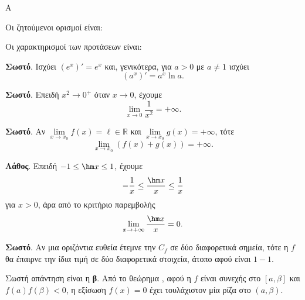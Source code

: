 \begin{thema}{Α}
\begin{erwthma}
\item {}

\item Οι ζητούμενοι ορισμοί είναι:

\item {}

\item Οι χαρακτηρισμοί των προτάσεων είναι:
\begin{alist}
\item \textbf{Σωστό}. Ισχύει $(e^x)'=e^x$ και, γενικότερα, για $a>0$ με $a\neq1$ ισχύει
\[ (a^x)'=a^x\ln a. \]
\item \textbf{Σωστό}. Επειδή $x^2\to0^+$ όταν $x\to0$, έχουμε
\[ \lim_{x\to0}\dfrac{1}{x^2}=+\infty. \]
\item \textbf{Σωστό}. Αν $\lim\limits_{x\to x_0}f(x)=\ell\in\mathbb{R}$ και $\lim\limits_{x\to x_0}g(x)=+\infty$, τότε
\[ \lim_{x\to x_0}(f(x)+g(x))=+\infty. \]
\item \textbf{Λάθος}. Επειδή $-1\leq \hm x\leq1$, έχουμε
\[ -\dfrac{1}{x}\leq\dfrac{\hm x}{x}\leq\dfrac{1}{x} \]
για $x>0$, άρα από το κριτήριο παρεμβολής
\[ \lim_{x\to+\infty}\dfrac{\hm x}{x}=0. \]
\item \textbf{Σωστό}. Αν μια οριζόντια ευθεία έτεμνε την $C_f$ σε δύο διαφορετικά σημεία, τότε η $f$ θα έπαιρνε την ίδια τιμή σε δύο διαφορετικά στοιχεία, άτοπο αφού είναι $1-1$.
\end{alist}

\item Σωστή απάντηση είναι η \textbf{β}. Από το θεώρημα , αφού η $f$ είναι συνεχής στο $[a,\beta]$ και $f(a)f(\beta)<0$, η εξίσωση $f(x)=0$ έχει τουλάχιστον μία ρίζα στο $(a,\beta)$.
\end{erwthma}
\end{thema}

